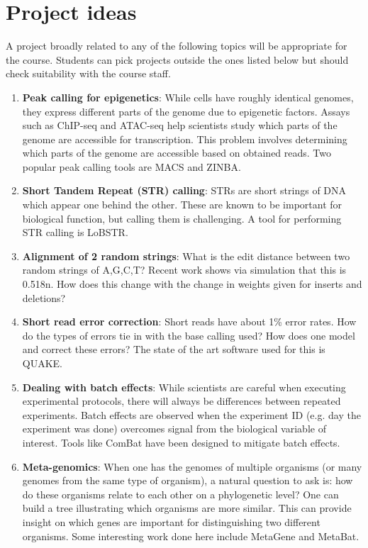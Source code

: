 \documentclass[11pt,onecolumn]{article}
\begin{document}
\section{Project ideas}
A project broadly related to any of the following topics will be  appropriate for the course. Students can pick projects outside the ones listed below 
but should check suitability with the course staff.

\begin{enumerate}
	\item \textbf{Peak calling for epigenetics}: While cells have roughly identical genomes, they express different parts of the genome due to epigenetic factors. Assays such as ChIP-seq and ATAC-seq help scientists study which parts of the genome are accessible for transcription. This problem involves determining which parts of the genome are accessible based on obtained reads. Two popular peak calling tools are MACS and ZINBA.
	\item \textbf{Short Tandem Repeat (STR) calling}: STRs are short strings of DNA which appear one behind the other. These are known to be important for biological function, but calling them is challenging. A tool for performing STR calling is LoBSTR.
	\item \textbf{Alignment of 2 random strings}: What is the edit distance between two random strings of A,G,C,T? Recent work shows via simulation that this is 0.518n. How does this change with the change in weights given for inserts and deletions?
	\item \textbf{Short read error correction}: Short reads have about 1\% error rates. How do the types of errors tie in with the base calling used? How does one model and correct these errors? The state of the art software used for this is QUAKE.
	\item \textbf{Dealing with batch effects}: While scientists are careful when executing experimental protocols, there will always be differences between repeated experiments. Batch effects are observed when the experiment ID (e.g. day the experiment was done) overcomes signal from the biological variable of interest. Tools like ComBat have been designed to mitigate batch effects.
	\item \textbf{Meta-genomics}: When one has the genomes of multiple organisms (or many genomes from the same type of organism), a natural question to ask is: how do these organisms relate to each other on a phylogenetic level? One can build a tree illustrating which organisms are more similar. This can provide insight on which genes are important for distinguishing two different organisms. Some interesting work done here include MetaGene and MetaBat.

\end{enumerate}
\end{document}
